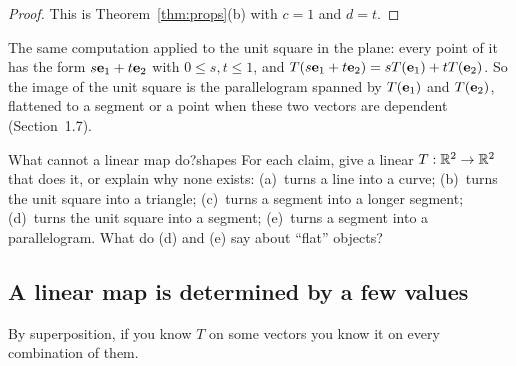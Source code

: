 \documentclass[11pt]{article}
\begin{document}
\begin{proof}
This is Theorem~\ref{thm:props}(b) with $c=1$ and $d=t$.
\end{proof}

The same computation applied to the unit square in the plane: every point of it has the form $s\mathbf{e}_1+t\mathbf{e}_2$ with $0\le s,t\le1$, and $T(s\mathbf{e}_1+t\mathbf{e}_2)=sT(\mathbf{e}_1)+tT(\mathbf{e}_2)$. So the image of the unit square is the parallelogram spanned by $T(\mathbf{e}_1)$ and $T(\mathbf{e}_2)$, flattened to a segment or a point when these two vectors are dependent (Section~1.7).

\begin{think}{What cannot a linear map do?}{shapes}
For each claim, give a linear $T:\mathbb{R}^2\to\mathbb{R}^2$ that does it, or explain why none exists: (a)~turns a line into a curve; (b)~turns the unit square into a triangle; (c)~turns a segment into a longer segment; (d)~turns the unit square into a segment; (e)~turns a segment into a parallelogram. What do (d) and (e) say about ``flat'' objects?
\end{think}

\subsection*{A linear map is determined by a few values}

By superposition, if you know $T$ on some vectors you know it on every combination of them.
\end{document}
